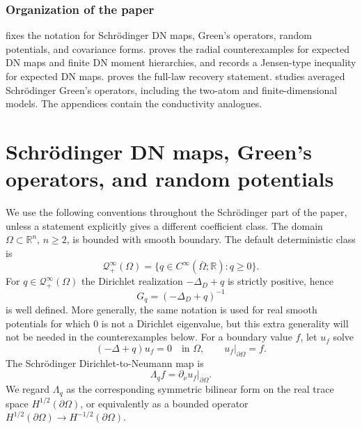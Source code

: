 \documentclass[11pt]{article}
\newcommand{\OmegaD}{\Omega}
\newcommand{\R}{\mathbb R}
\theoremstyle{plain}
\theoremstyle{definition}
\theoremstyle{remark}
\begin{document}
\subsubsection*{Organization of the paper}

  fixes the notation for Schr\"odinger DN maps, Green's operators, random potentials, and covariance forms.   proves the radial counterexamples for expected DN maps and finite DN moment hierarchies, and records a Jensen-type inequality for expected DN maps.   proves the full-law recovery statement.   studies averaged Schr\"odinger Green's operators, including the two-atom and finite-dimensional models.  The appendices contain the conductivity analogues.

\section{Schr\"odinger DN maps, Green's operators, and random potentials}\label{sec:Schrodinger-setup}

We use the following conventions throughout the Schr\"odinger part of the paper, unless a statement explicitly gives a different coefficient class.  The domain $\OmegaD\subset\R^n$, $n\ge2$, is bounded with smooth boundary.  The default deterministic class is
\[
  \mathcal Q_+^\infty(\OmegaD)
  =\{q\in C^\infty(\overline\OmegaD;\R): q\ge0\}.
\]
For $q\in \mathcal Q_+^\infty(\OmegaD)$ the Dirichlet realization $-\Delta_D+q$ is strictly positive, hence
\[
  G_q=(-\Delta_D+q)^{-1}
\]
is well defined.  More generally, the same notation is used for real smooth potentials for which $0$ is not a Dirichlet eigenvalue, but this extra generality will not be needed in the counterexamples below.  For a boundary value $f$, let $u_f$ solve
\[
  (-\Delta+q)u_f=0\quad\text{in }\OmegaD,
  \qquad u_f|_{\partial\OmegaD}=f.
\]
The Schr\"odinger Dirichlet-to-Neumann map is
\[
  \Lambda_qf=\partial_\nu u_f|_{\partial\OmegaD}.
\]
We regard $\Lambda_q$ as the corresponding symmetric bilinear form on the real trace space $H^{1/2}(\partial\OmegaD)$, or equivalently as a bounded operator $H^{1/2}(\partial\OmegaD)\to H^{-1/2}(\partial\OmegaD)$.
\end{document}
